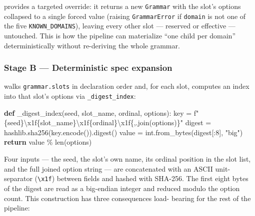 \documentclass[
]{article}
\newenvironment{Shaded}{}{}
\newcommand{\BuiltInTok}[1]{\textcolor[rgb]{0.00,0.50,0.00}{#1}}
\newcommand{\CharTok}[1]{\textcolor[rgb]{0.25,0.44,0.63}{#1}}
\newcommand{\ControlFlowTok}[1]{\textcolor[rgb]{0.00,0.44,0.13}{\textbf{#1}}}
\newcommand{\DecValTok}[1]{\textcolor[rgb]{0.25,0.63,0.44}{#1}}
\newcommand{\KeywordTok}[1]{\textcolor[rgb]{0.00,0.44,0.13}{\textbf{#1}}}
\newcommand{\NormalTok}[1]{#1}
\newcommand{\OperatorTok}[1]{\textcolor[rgb]{0.40,0.40,0.40}{#1}}
\newcommand{\SpecialCharTok}[1]{\textcolor[rgb]{0.25,0.44,0.63}{#1}}
\newcommand{\SpecialStringTok}[1]{\textcolor[rgb]{0.73,0.40,0.53}{#1}}
\newcommand{\StringTok}[1]{\textcolor[rgb]{0.25,0.44,0.63}{#1}}
\begin{document}
 provides a targeted override:
it returns a new \texttt{Grammar} with the 
slot's options collapsed to a single forced value (raising
\texttt{GrammarError} if \texttt{domain} is not one of the five
\texttt{KNOWN\_DOMAINS}), leaving every other slot --- reserved or
effective --- untouched. This is how the pipeline can materialize ``one
child per domain'' deterministically without re-deriving the whole
grammar.

\subsubsection{Stage B --- Deterministic spec
expansion}\label{stage-b-deterministic-spec-expansion}

 walks \texttt{grammar.slots} in
declaration order and, for each slot, computes an index into that slot's
options via \texttt{\_digest\_index}:

\begin{Shaded}
\begin{Highlighting}[]
\KeywordTok{def}\NormalTok{ \_digest\_index(seed, slot\_name, ordinal, options):}
\NormalTok{    key }\OperatorTok{=} \SpecialStringTok{f"}\SpecialCharTok{\{}\NormalTok{seed}\SpecialCharTok{\}}\CharTok{\textbackslash{}x1f}\SpecialCharTok{\{}\NormalTok{slot\_name}\SpecialCharTok{\}}\CharTok{\textbackslash{}x1f}\SpecialCharTok{\{}\NormalTok{ordinal}\SpecialCharTok{\}}\CharTok{\textbackslash{}x1f}\SpecialCharTok{\{}\StringTok{\textquotesingle{},\textquotesingle{}}\SpecialCharTok{.}\NormalTok{join(options)}\SpecialCharTok{\}}\SpecialStringTok{"}
\NormalTok{    digest }\OperatorTok{=}\NormalTok{ hashlib.sha256(key.encode()).digest()}
\NormalTok{    value }\OperatorTok{=} \BuiltInTok{int}\NormalTok{.from\_bytes(digest[:}\DecValTok{8}\NormalTok{], }\StringTok{"big"}\NormalTok{)}
    \ControlFlowTok{return}\NormalTok{ value }\OperatorTok{\%} \BuiltInTok{len}\NormalTok{(options)}
\end{Highlighting}
\end{Shaded}

Four inputs --- the seed, the slot's own name, its ordinal position in
the slot list, and the full joined option string --- are concatenated
with an ASCII unit-separator (\texttt{\textbackslash{}x1f}) between
fields and hashed with SHA-256. The first eight bytes of the digest are
read as a big-endian integer and reduced modulo the option count. This
construction has three consequences load- bearing for the rest of the
pipeline:
\end{document}
